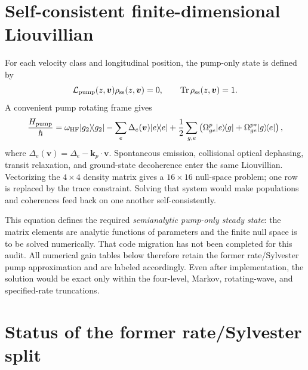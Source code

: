 \documentclass[11pt,a4paper]{article}
\newcommand{\Tr}{\operatorname{Tr}}
\newcommand{\ketbra}[2]{\lvert #1\rangle\!\langle #2\rvert}
\begin{document}
\section{Self-consistent finite-dimensional Liouvillian}

For each velocity class and longitudinal position, the pump-only state is
defined by
\begin{equation}
\mathcal L_{\rm pump}(z,\bm v)\rho_{\rm ss}(z,\bm v)=0,\qquad
\Tr\rho_{\rm ss}(z,\bm v)=1 .
\label{eq:pump-nullspace}
\end{equation}
A convenient pump rotating frame gives
\begin{equation}
\frac{H_{\rm pump}}{\hbar}=
\omega_{\rm HF}\ketbra{g_2}{g_2}
-\sum_e\Delta_e(\bm v)\ketbra{e}{e}
+\frac12\sum_{g,e}
\left(\Omega^p_{ge}\ketbra{e}{g}+\Omega^{p*}_{ge}\ketbra{g}{e}\right),
\label{eq:pump-hamiltonian}
\end{equation}
where $\Delta_e(\bm v)=\Delta_e-\bm k_p\cdot\bm v$.
Spontaneous emission, collisional optical dephasing, transit relaxation, and
ground-state decoherence enter the same Liouvillian. Vectorizing the
$4\times4$ density matrix gives a $16\times16$ null-space problem; one row is
replaced by the trace constraint. Solving that system would make populations
and coherences feed back on one another self-consistently.

This equation defines the required \emph{semianalytic pump-only steady
state}: the matrix elements are analytic functions of parameters and the
finite null space is to be solved numerically. That code migration has not
been completed for this audit. All numerical gain tables below therefore
retain the former rate/Sylvester pump approximation and are labeled
accordingly. Even after implementation, the solution would be exact only
within the four-level, Markov, rotating-wave, and specified-rate truncations.

\section{Status of the former rate/Sylvester split}
\end{document}
